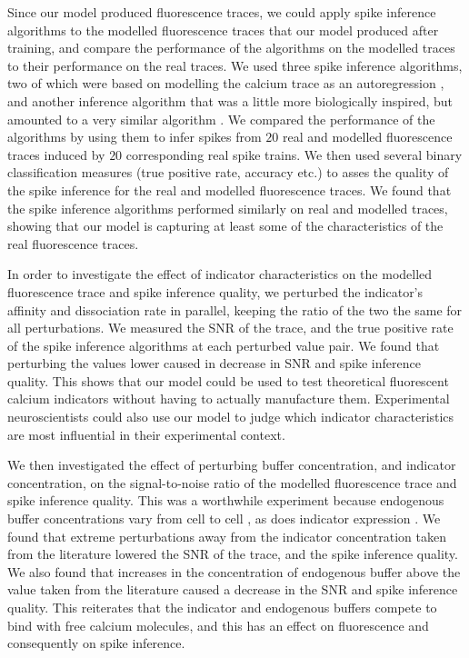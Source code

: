 Since our model produced fluorescence traces, we could apply spike inference algorithms to the modelled fluorescence traces that our model produced after training, and compare the performance of the algorithms on the modelled traces to their performance on the real traces. We used three spike inference algorithms, two of which were based on modelling the calcium trace as an autoregression \parencite{friedrich, pnevmatikakis}, and another inference algorithm that was a little more biologically inspired, but amounted to a very similar algorithm \parencite{deneux}. We compared the performance of the algorithms by using them to infer spikes from $20$ real and modelled fluorescence traces induced by $20$ corresponding real spike trains. We then used several binary classification measures (true positive rate, accuracy etc.) to asses the quality of the spike inference for the real and modelled fluorescence traces. We found that the spike inference algorithms performed similarly on real and modelled traces, showing that our model is capturing at least some of the characteristics of the real fluorescence traces.

In order to investigate the effect of indicator characteristics on the modelled fluorescence trace and spike inference quality, we perturbed the indicator's affinity and dissociation rate in parallel, keeping the ratio of the two the same for all perturbations. We measured the SNR of the trace, and the true positive rate of the spike inference algorithms at each perturbed value pair. We found that perturbing the values lower caused in decrease in SNR and spike inference quality. This shows that our model could be used to test theoretical fluorescent calcium indicators without having to actually manufacture them. Experimental neuroscientists could also use our model to judge which indicator characteristics are most influential in their experimental context.

We then investigated the effect of perturbing buffer concentration, and indicator concentration, on the signal-to-noise ratio of the modelled fluorescence trace and spike inference quality. This was a worthwhile experiment because endogenous buffer concentrations vary from cell to cell \parencite{bartol, maravall, neher}, as does indicator expression \parencite{chen}. We found that extreme perturbations away from the indicator concentration taken from the literature lowered the SNR of the trace, and the spike inference quality. We also found that increases in the concentration of endogenous buffer above the value taken from the literature caused a decrease in the SNR and spike inference quality. This reiterates that the indicator and endogenous buffers compete to bind with free calcium molecules, and this has an effect on fluorescence and consequently on spike inference.

